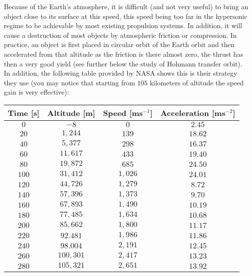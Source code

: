	
	Because of the Earth's atmosphere, it is difficult (and not very useful) to bring an object close to its surface at this speed, this speed being too far in the hypersonic regime to be achievable by most existing propulsion systems. In addition, it will cause a destruction of most objects by atmospheric friction or compression. In practice, an object is first placed in circular orbit of the Earth orbit and then accelerated from that altitude as the friction is there almost zero, the thrust has then a very good yield (see further below the study of Hohmann transfer orbit). In addition, the following table provided by NASA shows this is their strategy they use (you may notice that starting from $105$ kilometers of altitude the speed gain is very effective):
		\begin{table}[H]\centering
	\begin{center}
			\begin{tabular}{|c|c|c|c|}
				\hline
  \multicolumn{1}{c}{\cellcolor{black!30}\textbf{Time [s]}} & 
  \multicolumn{1}{c}{\cellcolor{black!30}\textbf{Altitude [m]}} & 
  \multicolumn{1}{c}{\cellcolor{black!30}\textbf{Speed [ms$^{-1}$]}} & 
  \multicolumn{1}{c}{\cellcolor{black!30}\textbf{Acceleration [ms$^{-2}$]}}\\ \hline
				$0$ & $-8$ & $0$ & $2.45$\\ \hline
				$20$ & $1,244$ & $139$ & $18.62$\\ \hline
				$40$ & $5,377$ & $298$ & $16.37$\\ \hline
				$60$ & $11,617$ & $433$ & $19.40$\\ \hline
				$80$ & $19,872$ & $685$ & $24.50$\\ \hline
				$100$ & $31,412$ & $1,026$ & $24.01$\\ \hline
				$120$ & $44,726$ & $1,279$ & $8.72$\\ \hline
				$140$ & $57,396$ & $1,373$ & $9.70$\\ \hline
				$160$ & $67,893$ & $1,490$ & $10.19$\\ \hline
				$180$ & $77,485$ & $1,634$ & $10.68$\\ \hline
				$200$ & $85,662$ & $1,800$ & $11.17$\\ \hline
				$220$ & $92.481$ & $1,986$ & $11.86$\\ \hline
				$240$ & $98.004$ & $2,191$ & $12.45$\\ \hline
				$260$ & $100,301$ & $2,417$ & $13.23$\\ \hline
				$280$ & $105,321$ & $2,651$ & $13.92$\\ \hline

\end{tabular}
\end{center}
\end{table}
